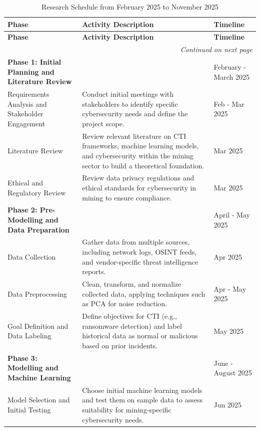 \documentclass[a4paper,twoside,12pt]{report}
\begin{document}
\begin{longtable}{|p{4cm}|p{9.5cm}|p{2.5cm}|}
    \caption{Research Schedule from February 2025 to November 2025} \label{table:schedule_of_work} \\  
    \hline
    \textbf{Phase} & \textbf{Activity Description} & \textbf{Timeline} \\
    \hline\hline
    \endfirsthead

    \hline
    \textbf{Phase} & \textbf{Activity Description} & \textbf{Timeline} \\
    \hline\hline
    \endhead

    \hline \multicolumn{3}{r}{\textit{Continued on next page}} \\
    \endfoot

    \hline
    \endlastfoot

    \textbf{Phase 1: Initial Planning and Literature Review} & & February - March 2025 \\
    \hline
    Requirements Analysis and Stakeholder Engagement & Conduct initial meetings with stakeholders to identify specific cybersecurity needs and define the project scope. & Feb - Mar 2025 \\
    \hline
    Literature Review & Review relevant literature on CTI frameworks, machine learning models, and cybersecurity within the mining sector to build a theoretical foundation. & Mar 2025 \\
    \hline
    Ethical and Regulatory Review & Review data privacy regulations and ethical standards for cybersecurity in mining to ensure compliance. & Mar 2025 \\
    \hline
    \textbf{Phase 2: Pre-Modelling and Data Preparation} & & April - May 2025 \\
    \hline
    Data Collection & Gather data from multiple sources, including network logs, OSINT feeds, and vendor-specific threat intelligence reports. & Apr 2025 \\
    \hline
    Data Preprocessing & Clean, transform, and normalize collected data, applying techniques such as PCA for noise reduction. & Apr - May 2025 \\
    \hline
    Goal Definition and Data Labeling & Define objectives for CTI (e.g., ransomware detection) and label historical data as normal or malicious based on prior incidents. & May 2025 \\
    \hline
    \textbf{Phase 3: Modelling and Machine Learning} & & June - August 2025 \\
    \hline
    Model Selection and Initial Testing & Choose initial machine learning models and test them on sample data to assess suitability for mining-specific cybersecurity needs. & Jun 2025 \\

\end{longtable}
\end{document}
